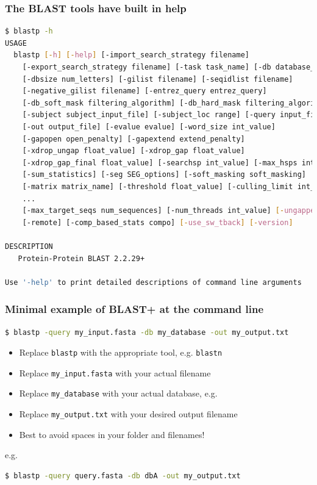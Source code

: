 \documentclass[table]{beamer}
\begin{document}
\begin{frame}[fragile]
\frametitle{The BLAST tools have built in help}
\begin{lstlisting}[language=sh]
$ blastp -h
USAGE
  blastp [-h] [-help] [-import_search_strategy filename]
    [-export_search_strategy filename] [-task task_name] [-db database_name]
    [-dbsize num_letters] [-gilist filename] [-seqidlist filename]
    [-negative_gilist filename] [-entrez_query entrez_query]
    [-db_soft_mask filtering_algorithm] [-db_hard_mask filtering_algorithm]
    [-subject subject_input_file] [-subject_loc range] [-query input_file]
    [-out output_file] [-evalue evalue] [-word_size int_value]
    [-gapopen open_penalty] [-gapextend extend_penalty]
    [-xdrop_ungap float_value] [-xdrop_gap float_value]
    [-xdrop_gap_final float_value] [-searchsp int_value] [-max_hsps int_value]
    [-sum_statistics] [-seg SEG_options] [-soft_masking soft_masking]
    [-matrix matrix_name] [-threshold float_value] [-culling_limit int_value]
    ...
    [-max_target_seqs num_sequences] [-num_threads int_value] [-ungapped]
    [-remote] [-comp_based_stats compo] [-use_sw_tback] [-version]

DESCRIPTION
   Protein-Protein BLAST 2.2.29+

Use '-help' to print detailed descriptions of command line arguments
\end{lstlisting}
\end{frame}


\begin{frame}[fragile]
\frametitle{Minimal example of BLAST+ at the command line}

\begin{lstlisting}[language=sh]
$ blastp -query my_input.fasta -db my_database -out my_output.txt
\end{lstlisting}

\begin{itemize}
\item Replace \texttt{blastp} with the appropriate tool, e.g. \texttt{blastn}
\item Replace \texttt{my\_input.fasta} with your actual filename
\item Replace \texttt{my\_database} with your actual database, e.g. 
\item Replace \texttt{my\_output.txt} with your desired output filename
\item Best to avoid spaces in your folder and filenames!
\end{itemize}

e.g.

\begin{lstlisting}[language=sh]
$ blastp -query query.fasta -db dbA -out my_output.txt
\end{lstlisting}

\end{frame}
\end{document}
